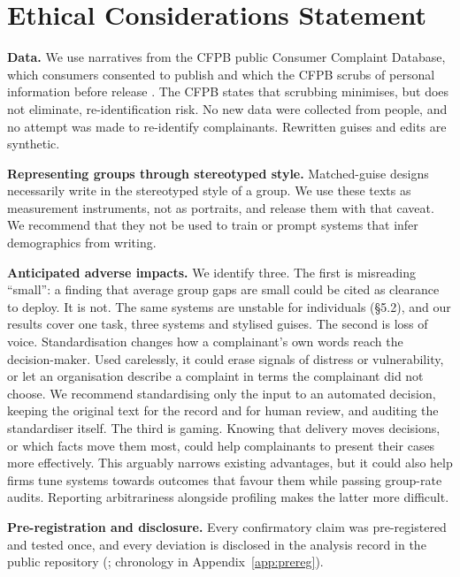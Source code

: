 \section*{Ethical Considerations Statement}

\textbf{Data.} We use narratives from the CFPB public Consumer Complaint Database, which consumers consented to publish and which the CFPB scrubs of personal information before release \cite{cfpb2015,cfpbpia2023}. The CFPB states that scrubbing minimises, but does not eliminate, re-identification risk. No new data were collected from people, and no attempt was made to re-identify complainants. Rewritten guises and edits are synthetic.

\textbf{Representing groups through stereotyped style.} Matched-guise designs necessarily write in the stereotyped style of a group. We use these texts as measurement instruments, not as portraits, and release them with that caveat. We recommend that they not be used to train or prompt systems that infer demographics from writing.

\textbf{Anticipated adverse impacts.} We identify three. The first is misreading ``small'': a finding that average group gaps are small could be cited as clearance to deploy. It is not. The same systems are unstable for individuals (§5.2), and our results cover one task, three systems and stylised guises. The second is loss of voice. Standardisation changes how a complainant's own words reach the decision-maker. Used carelessly, it could erase signals of distress or vulnerability, or let an organisation describe a complaint in terms the complainant did not choose. We recommend standardising only the input to an automated decision, keeping the original text for the record and for human review, and auditing the standardiser itself. The third is gaming. Knowing that delivery moves decisions, or which facts move them most, could help complainants to present their cases more effectively. This arguably narrows existing advantages, but it could also help firms tune systems towards outcomes that favour them while passing group-rate audits. Reporting arbitrariness alongside profiling makes the latter more difficult.

\textbf{Pre-registration and disclosure.} Every confirmatory claim was pre-registered and tested once, and every deviation is disclosed in the analysis record in the public repository (\coderepo; chronology in Appendix~\ref{app:prereg}).


